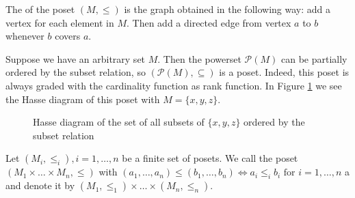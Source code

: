 \begin{defi}
	The  of the poset $(M,\leq)$ is the graph obtained in the following way: add a vertex for each element in $M$. Then add a directed edge from vertex $a$ to $b$ whenever $b$ covers $a$.
\end{defi}

\begin{exam}
	Suppose we have an arbitrary set $M$. Then the powerset $\mathcal P (M)$ can be partially ordered by the subset relation, so $(\mathcal P (M), \subseteq)$ is a poset. Indeed, this poset is always graded with the cardinality function as rank function. In Figure \ref{fig:poset-xyz-subsets} we see the Hasse diagram of this poset with $M = \{x,y,z\}$.

	\begin{figure}[ht]
		\centering
		
		\caption{Hasse diagram of the set of all subsets of $\{x,y,z\}$ ordered by the subset relation}
		\label{fig:poset-xyz-subsets}
	\end{figure}
\end{exam}

\begin{defi}
	Let $(M_i, \leq_i), i = 1,\ldots,n$ be a finite set of posets. We call the poset $(M_1 \times \ldots \times M_n,\leq)$ with $(a_1,\ldots,a_n) \leq (b_1,\ldots,b_n) \iff a_i \leq_i b_i \textrm{ for } i=1,\ldots,n$ a  and denote it by $(M_1, \leq_1) \times \ldots \times (M_n, \leq_n)$.
\end{defi}